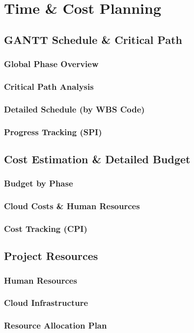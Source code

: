 \chapter{Time \& Cost Planning}
    \section{GANTT Schedule \& Critical Path}
        \subsection{Global Phase Overview}
        \subsection{Critical Path Analysis}  
        \subsection{Detailed Schedule (by WBS Code)}
        \subsection{Progress Tracking (SPI)}
    \section{Cost Estimation \& Detailed Budget}
        \subsection{Budget by Phase}
        \subsection{Cloud Costs \& Human Resources}
        \subsection{Cost Tracking (CPI)}
    \section{Project Resources}
        \subsection{Human Resources}
        \subsection{Cloud Infrastructure}
        \subsection{Resource Allocation Plan}